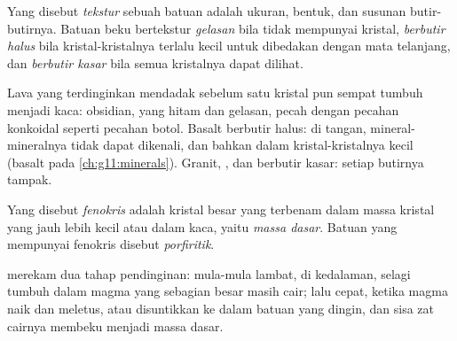 \begin{definition}[Tekstur]\label{def:g11:igneous-rocks:texture}
Yang disebut \emph{tekstur} sebuah batuan adalah ukuran,
bentuk, dan susunan butir-butirnya. Batuan beku bertekstur \emph{gelasan} bila
tidak mempunyai kristal, \emph{berbutir halus} bila kristal-kristalnya terlalu
kecil untuk dibedakan dengan mata telanjang, dan \emph{berbutir kasar} bila
semua kristalnya dapat dilihat.
\end{definition}

Lava yang terdinginkan mendadak sebelum satu kristal pun sempat tumbuh menjadi
kaca: obsidian, yang hitam dan gelasan, pecah dengan pecahan konkoidal seperti
pecahan botol. Basalt berbutir halus: di tangan, mineral-mineralnya tidak dapat
dikenali, dan bahkan dalam  kristal-kristalnya kecil (basalt pada
\cref{ch:g11:minerals}). Granit, , dan  berbutir kasar: setiap
butirnya tampak.

\begin{definition}\label{def:g11:igneous-rocks:porphyritic}
Yang disebut \emph{fenokris} adalah kristal besar yang terbenam
dalam massa kristal yang jauh lebih kecil atau dalam kaca, yaitu \emph{massa
dasar}. Batuan yang mempunyai fenokris disebut \emph{porfiritik}.
\end{definition}

  merekam dua tahap pendinginan: mula-mula lambat, di
kedalaman, selagi  tumbuh dalam magma yang sebagian besar masih cair;
lalu cepat, ketika magma naik dan meletus, atau disuntikkan ke dalam batuan yang
dingin, dan sisa zat cairnya membeku menjadi massa dasar.

